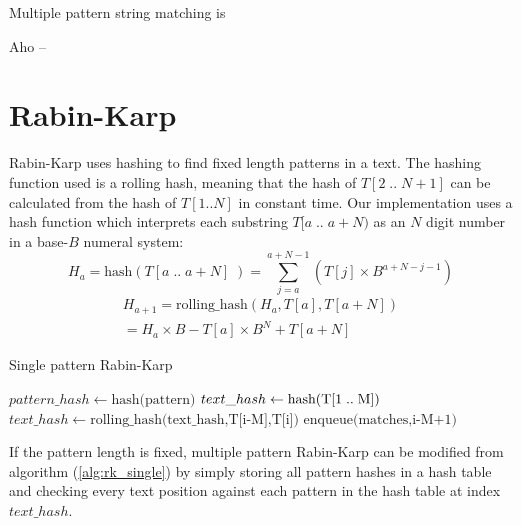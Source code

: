 \documentclass[final]{beamer}
\author{Aleksi Hartikainen and Jussi Kokkala}
\begin{document}
\begin{poster}

\newcolumn

Multiple pattern string matching is 

Aho --

\section{Rabin-Karp}
      Rabin-Karp uses hashing to find fixed length patterns in a text. The hashing function used is a rolling hash, meaning that the hash of $T[2\;..\;N+1]$ can be calculated from the hash of $T[1..N]$ in constant time. Our implementation uses a hash function which interprets each substring $T[a\;..\;a+N)$ as an $N$ digit number in a base-$B$ numeral system:
\small
\begin{equation*}
H_a = \text{hash}(T[a\;..\;a+N]\;) = \sum_{j=a}^{a+N-1}(T[j] \times B^{a+N-j-1})
\end{equation*}
      \vspace{-4mm}
\begin{equation*}
\begin{multlined}
H_{a+1} = \text{rolling\_hash}(H_a, T[a], T[a+N])\\
= H_a \times B -  T[a] \times B^{N}  + T[a+N]
\end{multlined}
\end{equation*}
\normalsize
\vspace{10mm}
\begin{algorithm} [H]
\small
\caption{Single pattern Rabin-Karp}
\label{alg:rk_single}

\begin{algorithmic}[1]

\State $pattern\_hash \gets \text{hash(pattern)}$
\State $text\_hash \gets \text{hash(T[1\;..\;M])}$
        \State  $text\_hash \gets \text{rolling\_hash(text\_hash,T[i-M],T[i])}$
    \EndIf
            \State $\text{enqueue(matches,i-M+1)}$
        \EndIf
    \EndIf
\EndFor
\end{algorithmic}
\end{algorithm}

If the pattern length is fixed, multiple pattern Rabin-Karp can be modified from algorithm (\ref{alg:rk_single}) by simply storing all pattern hashes in a hash table and checking every text position against each pattern in the hash table at index $text\_hash$.


\end{poster}
\end{document}
